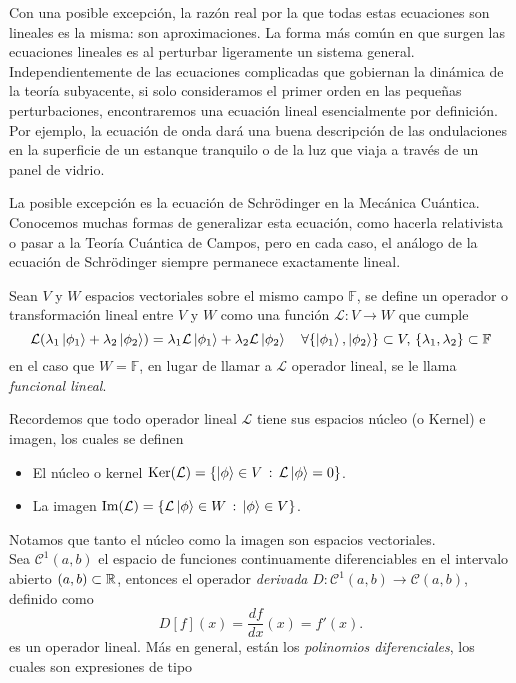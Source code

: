 \documentclass[main.tex]{subfiles}
\begin{document}
Con una posible excepción, la razón real por la que todas estas ecuaciones son lineales es la misma: son aproximaciones. La forma más común en que surgen las ecuaciones lineales es al perturbar ligeramente un sistema general. Independientemente de las ecuaciones complicadas que gobiernan la dinámica de la teoría subyacente, si solo consideramos el primer orden en las pequeñas perturbaciones, encontraremos una ecuación lineal esencialmente por definición. Por ejemplo, la ecuación de onda dará una buena descripción de las ondulaciones en la superficie de un estanque tranquilo o de la luz que viaja a través de un panel de vidrio.

La posible excepción es la ecuación de Schrödinger en la Mecánica Cuántica. Conocemos muchas formas de generalizar esta ecuación, como hacerla relativista o pasar a la Teoría Cuántica de Campos, pero en cada caso, el análogo de la ecuación de Schrödinger siempre permanece exactamente lineal.
\begin{def.}
  Sean \(V\) y \(W\) espacios vectoriales sobre el mismo campo \(\mathbb{F}\), se define un operador o transformación lineal entre \(V\) y \(W\) como una función \(\mathcal{L}:V\rightarrow W\) que cumple
  \[
    \mathcal{L}(\lambda_1\ket{\phi_1}+\lambda_2\ket{\phi_2})= \lambda_1\mathcal{L}\ket{\phi_1}+\lambda_2\mathcal{L}\ket{\phi_2}\quad\forall\{\ket{\phi_1},\ket{\phi_2}\}\subset V,\,\{\lambda_1,\lambda_2\}\subset\mathbb{F}
  \]
\noindent en el caso que \(W=\mathbb{F}\), en lugar de llamar a \(\mathcal{L}\) operador lineal, se le llama \emph{funcional lineal}.
\end{def.}
Recordemos que todo operador lineal \(\mathcal{L}\) tiene sus espacios núcleo (o Kernel) e imagen, los cuales se definen
\begin{itemize}
  \item El núcleo o kernel \(\textrm{Ker}(\mathcal{L})=\{\ket{\phi}\in V \,:\,\mathcal{L}\ket{\phi}=0\}\).
  \item La imagen \(\textrm{Im}(\mathcal{L})=\{\mathcal{L}\ket{\phi}\in W\,:\,\ket{\phi}\in V\}\).
  \end{itemize}
Notamos que tanto el núcleo como la imagen son espacios vectoriales.\\
\eje Sea \(\mathcal{C}^1(a,b)\) el espacio de funciones continuamente diferenciables en el intervalo abierto \((a,b)\subset\mathbb R \), entonces el operador \emph{derivada} \(D:\mathcal{C}^1(a,b)\rightarrow\mathcal{C}(a,b)\), definido como
\[
D[f](x)=\dfrac{df}{dx}(x)=f'(x).
\]
\noindent es un operador lineal. Más en general, están los \emph{polinomios diferenciales}, los cuales son expresiones de tipo
\end{document}
